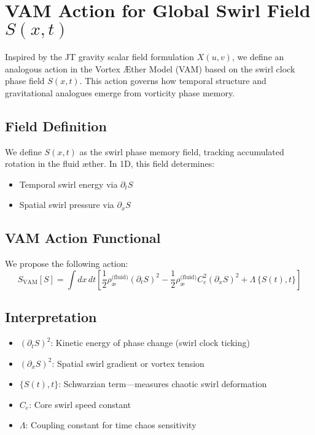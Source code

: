 \documentclass[12pt]{article}
\begin{document}
            \section*{VAM Action for Global Swirl Field $S(x,t)$}
            Inspired by the JT gravity scalar field formulation $X(u,v)$, we define an analogous action in the Vortex \AE ther Model (VAM) based on the swirl clock phase field $S(x,t)$. This action governs how temporal structure and gravitational analogues emerge from vorticity phase memory.

            \subsection*{Field Definition}
            We define $S(x,t)$ as the swirl phase memory field, tracking accumulated rotation in the fluid æther. In 1D, this field determines:
            \begin{itemize}
            \item Temporal swirl energy via $\partial_t S$
            \item Spatial swirl pressure via $\partial_x S$
            \end{itemize}

            \subsection{VAM Action Functional}
            We propose the following action:
            \begin{equation}
            \boxed{
            S_{\text{VAM}}[S] = \int dx \, dt \left[
            \frac{1}{2} \rho_{\text{\ae}}^{\text{(fluid)}} (\partial_t S)^2
            - \frac{1}{2} \rho_{\text{\ae}}^{\text{(fluid)}} C_e^2 (\partial_x S)^2
            + \Lambda \, \{ S(t), t \}
            \right]
            }
            \end{equation}

            \subsection*{Interpretation}
            \begin{itemize}
            \item $(\partial_t S)^2$: Kinetic energy of phase change (swirl clock ticking)
            \item $(\partial_x S)^2$: Spatial swirl gradient or vortex tension
                \item $\{ S(t), t \}$: Schwarzian term—measures chaotic swirl deformation
            \item $C_e$: Core swirl speed constant
            \item $\Lambda$: Coupling constant for time chaos sensitivity
            \end{itemize}
\end{document}
